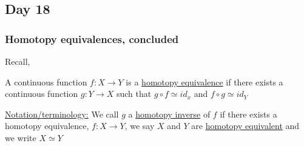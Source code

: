 \subsection{Day 18}
\subsubsection{Homotopy equivalences, concluded}
Recall,
\begin{definition}
    A continuous function $f:X\rightarrow Y$ is a \underline{homotopy equivalence} if there exists
    a continuous function $g:Y\rightarrow X$ such that $g\circ f\simeq id_x$ and $f\circ g \simeq id_Y$\\

\end{definition}
    \underline{Notation/terminology:}
    We call $g$ a \underline{homotopy inverse} of $f$ if there exists a homotopy equivalence,
    $f:X\rightarrow Y$, we say $X$ and $Y$ are \underline{homotopy equivalent} and we write $X\simeq Y$
